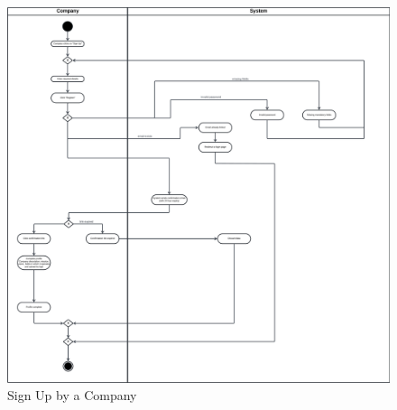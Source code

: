 \begin{figure}[H]
    \begin{center}
         \includegraphics[width=1\linewidth]{LaTeXCode/images/activity diagram/UC2.jpeg}
         \caption{Sign Up by a Company}
         \label{fig:signup_company_ad}
     \end{center}
\end{figure}

\newpage

